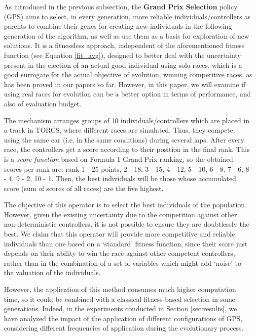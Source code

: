 \documentclass[10pt,journal,compsoc]{IEEEtran}
\begin{document}
As introduced in the previous subsection, the \textbf{Grand Prix Selection} policy (GPS)  aims to select, in every generation, more reliable individuals/controllers as parents to combine their genes for creating new individuals in the following generation of the algorithm, as well as use them as a basis for exploration of new solutions. It is a fitnessless approach,
independent of the aforementioned fitness function (see Equation
\ref{fit_avg}), designed to better deal with the uncertainty present
in the election of an actual good individual using solo races, which
is a good surrogate for the actual objective of evolution, winning
competitive races, as has been proved in our papers so far. However,
in this paper, we will examine if using real races for evolution can be
a better option in terms of performance, and also of evaluation
budget. 

The mechanism arranges groups of 10 individuals/controllers which are placed in a track in TORCS, where different races are simulated. Thus, they compete, using the same car (i.e. in the same conditions) during several laps. After every race, the controllers get a score according to their position in the final rank. This is a \textit{score function} based on Formula 1 Grand Prix ranking, so the obtained scores per rank are: rank 1 - 25 points, 2 - 18, 3 - 15, 4 - 12, 5 - 10, 6 - 8, 7 - 6, 8 - 4, 9 - 2, 10 - 1.
Then, the best individuals will be those whose accumulated score (sum of scores of all races) are the five highest.

The objective of this operator is to select the best
individuals of the population. However, given the existing uncertainty
\cite{DBLP:journals/tcci/MereloLFGCCRMGTCC16} due to the competition
against other non-deterministic controllers, it is not possible to
ensure they are doubtlessly the best. We claim that this operator will
provide more competitive and reliable individuals than one based on a
`standard' fitness function, since their score just depends on their
ability to win the race against other competent controllers, rather
than in the combination of a set of variables which might add `noise'
to the valuation of the individuals.

However, the application of this method consumes much higher computation time, so it could be combined with a classical fitness-based selection in some generations. Indeed, in the experiments conducted in Section \ref{sec:results}, we have analyzed the impact of the application of different configurations of GPS, considering different frequencies of application during the evolutionary process.
\end{document}

